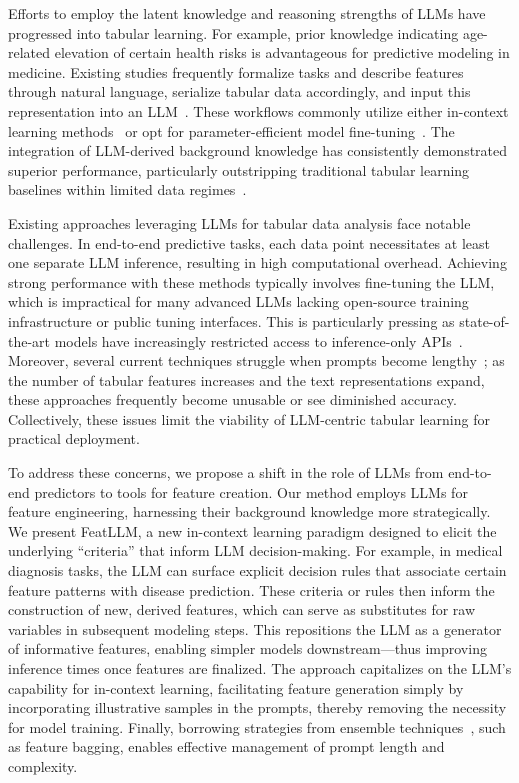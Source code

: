 Efforts to employ the latent knowledge and reasoning strengths of LLMs have progressed into tabular learning. For example, prior knowledge indicating age-related elevation of certain health risks is advantageous for predictive modeling in medicine. Existing studies frequently formalize tasks and describe features through natural language, serialize tabular data accordingly, and input this representation into an LLM~\cite{dinh2022lift,wang2023anypredict}. These workflows commonly utilize either in-context learning methods~\cite{nam2023semi} or opt for parameter-efficient model fine-tuning~\cite{dinh2022lift,hegselmann2023tabllm}. The integration of LLM-derived background knowledge has consistently demonstrated superior performance, particularly outstripping traditional tabular learning baselines within limited data regimes~\cite{hegselmann2023tabllm}.

Existing approaches leveraging LLMs for tabular data analysis face notable challenges. In end-to-end predictive tasks, each data point necessitates at least one separate LLM inference, resulting in high computational overhead. Achieving strong performance with these methods typically involves fine-tuning the LLM, which is impractical for many advanced LLMs lacking open-source training infrastructure or public tuning interfaces. This is particularly pressing as state-of-the-art models have increasingly restricted access to inference-only APIs~\cite{anil2023palm,openai2023gpt4}. Moreover, several current techniques struggle when prompts become lengthy~\cite{liu2023lost}; as the number of tabular features increases and the text representations expand, these approaches frequently become unusable or see diminished accuracy. Collectively, these issues limit the viability of LLM-centric tabular learning for practical deployment.

To address these concerns, we propose a shift in the role of LLMs from end-to-end predictors to tools for feature creation. Our method employs LLMs for feature engineering, harnessing their background knowledge more strategically. We present \textsf{FeatLLM}, a new in-context learning paradigm designed to elicit the underlying “criteria” that inform LLM decision-making. For example, in medical diagnosis tasks, the LLM can surface explicit decision rules that associate certain feature patterns with disease prediction. These criteria or rules then inform the construction of new, derived features, which can serve as substitutes for raw variables in subsequent modeling steps. This repositions the LLM as a generator of informative features, enabling simpler models downstream—thus improving inference times once features are finalized. The approach capitalizes on the LLM’s capability for in-context learning, facilitating feature generation simply by incorporating illustrative samples in the prompts, thereby removing the necessity for model training. Finally, borrowing strategies from ensemble techniques~\cite{breiman2001random}, such as feature bagging, enables effective management of prompt length and complexity.


